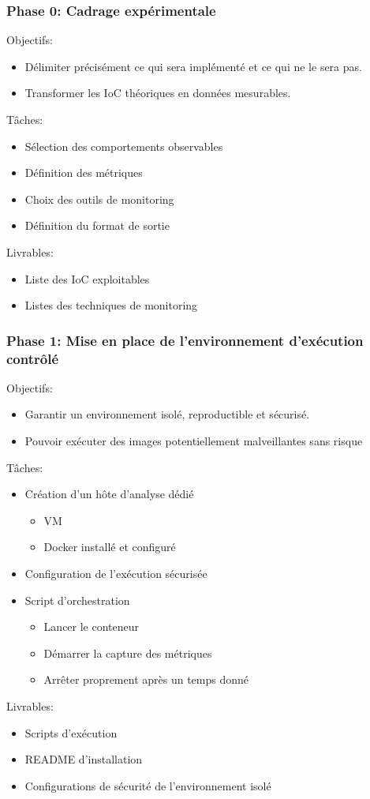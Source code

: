 \subsubsection{Phase 0: Cadrage expérimentale}
Objectifs:
\begin{itemize}
    \item Délimiter précisément ce qui sera implémenté et ce qui ne le sera pas.
    \item Transformer les IoC théoriques en données mesurables.
\end{itemize}
Tâches:
\begin{itemize}
    \item Sélection des comportements observables
    \item Définition des métriques
    \item Choix des outils de monitoring
    \item Définition du format de sortie
\end{itemize}
Livrables:
\begin{itemize}
    \item Liste des IoC exploitables
    \item Listes des techniques de monitoring
\end{itemize}

\subsubsection{Phase 1: Mise en place de l'environnement d'exécution contrôlé}
Objectifs:
\begin{itemize}
    \item Garantir un environnement isolé, reproductible et sécurisé.
    \item Pouvoir exécuter des images potentiellement malveillantes sans risque
\end{itemize}
Tâches:
\begin{itemize}
    \item Création d'un hôte d'analyse dédié
    \begin{itemize}
        \item VM
        \item Docker installé et configuré
    \end{itemize}
    \item Configuration de l'exécution sécurisée
    \item Script d'orchestration
    \begin{itemize}
        \item Lancer le conteneur
        \item Démarrer la capture des métriques
        \item Arrêter proprement après un temps donné
    \end{itemize}
\end{itemize}
Livrables:
\begin{itemize}
    \item Scripts d'exécution
    \item README d'installation
    \item Configurations de sécurité de l'environnement isolé
\end{itemize}

